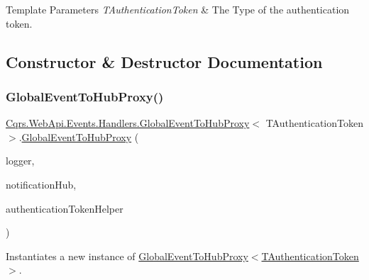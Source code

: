 \begin{DoxyTemplParams}{Template Parameters}
{\em T\+Authentication\+Token} & The Type of the authentication token.\\
\hline
\end{DoxyTemplParams}


\subsection{Constructor \& Destructor Documentation}
\mbox{\label{classCqrs_1_1WebApi_1_1Events_1_1Handlers_1_1GlobalEventToHubProxy_a42cb05f70d5705bd182f42caf297a960_a42cb05f70d5705bd182f42caf297a960}} 
\subsubsection{\texorpdfstring{Global\+Event\+To\+Hub\+Proxy()}{GlobalEventToHubProxy()}}
{\footnotesize\ttfamily \hyperlink{classCqrs_1_1WebApi_1_1Events_1_1Handlers_1_1GlobalEventToHubProxy}{Cqrs.\+Web\+Api.\+Events.\+Handlers.\+Global\+Event\+To\+Hub\+Proxy}$<$ T\+Authentication\+Token $>$.\hyperlink{classCqrs_1_1WebApi_1_1Events_1_1Handlers_1_1GlobalEventToHubProxy}{Global\+Event\+To\+Hub\+Proxy} (\begin{DoxyParamCaption}\item[{I\+Logger}]{logger,  }\item[{\hyperlink{interfaceCqrs_1_1WebApi_1_1SignalR_1_1Hubs_1_1INotificationHub}{I\+Notification\+Hub}}]{notification\+Hub,  }\item[{\hyperlink{interfaceCqrs_1_1Authentication_1_1IAuthenticationTokenHelper}{I\+Authentication\+Token\+Helper}$<$ T\+Authentication\+Token $>$}]{authentication\+Token\+Helper }\end{DoxyParamCaption})}



Instantiates a new instance of \hyperlink{classCqrs_1_1WebApi_1_1Events_1_1Handlers_1_1GlobalEventToHubProxy_a42cb05f70d5705bd182f42caf297a960_a42cb05f70d5705bd182f42caf297a960}{Global\+Event\+To\+Hub\+Proxy$<$\+T\+Authentication\+Token$>$}. 



